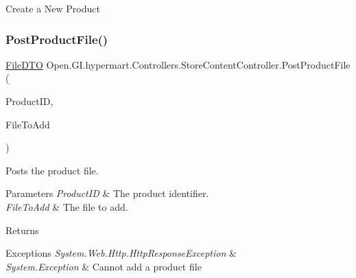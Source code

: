 Create a New Product 

\hypertarget{class_open_1_1_g_i_1_1hypermart_1_1_controllers_1_1_store_content_controller_aeab9cb977ea719d1baa4610b3bc6a631}{}\label{class_open_1_1_g_i_1_1hypermart_1_1_controllers_1_1_store_content_controller_aeab9cb977ea719d1baa4610b3bc6a631} 
\subsubsection{\texorpdfstring{Post\+Product\+File()}{PostProductFile()}}
{\footnotesize\ttfamily \hyperlink{class_open_1_1_g_i_1_1hypermart_1_1_data_transformation_objects_1_1_file_d_t_o}{File\+D\+TO} Open.\+G\+I.\+hypermart.\+Controllers.\+Store\+Content\+Controller.\+Post\+Product\+File (\begin{DoxyParamCaption}\item[{int}]{Product\+ID,  }\item[{\hyperlink{class_open_1_1_g_i_1_1hypermart_1_1_models_1_1_file}{Open.\+G\+I.\+hypermart.\+Models.\+File}}]{File\+To\+Add }\end{DoxyParamCaption})}



Posts the product file. 


\begin{DoxyParams}{Parameters}
{\em Product\+ID} & The product identifier.\\
\hline
{\em File\+To\+Add} & The file to add.\\
\hline
\end{DoxyParams}
\begin{DoxyReturn}{Returns}

\end{DoxyReturn}

\begin{DoxyExceptions}{Exceptions}
{\em System.\+Web.\+Http.\+Http\+Response\+Exception} & \\
\hline
{\em System.\+Exception} & Cannot add a product file\\
\hline
\end{DoxyExceptions}
\hypertarget{class_open_1_1_g_i_1_1hypermart_1_1_controllers_1_1_store_content_controller_ae9be0167fa1b3e2f785c08e04b602bc1}{}\label{class_open_1_1_g_i_1_1hypermart_1_1_controllers_1_1_store_content_controller_ae9be0167fa1b3e2f785c08e04b602bc1} 
